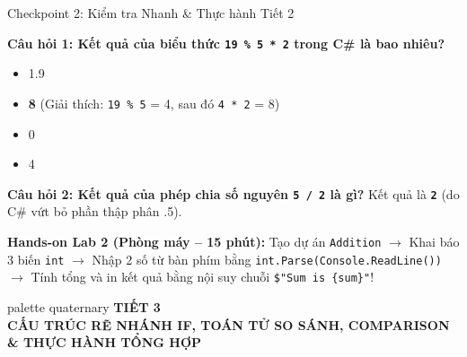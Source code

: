 \documentclass[aspectratio=169, 10pt]{beamer}
\begin{document}
\begin{frame}{Checkpoint 2: Kiểm tra Nhanh \& Thực hành Tiết 2}
  \begin{block}{\textbf{Câu hỏi 1: Kết quả của biểu thức \texttt{19 \% 5 * 2} trong C\# là bao nhiêu?}}
    \begin{itemize}
      \item[A.] 1.9
      \item[B.] \textbf{8} (Giải thích: \texttt{19 \% 5} = 4, sau đó \texttt{4 * 2} = 8)
      \item[C.] 0
      \item[D.] 4
    \end{itemize}
  \end{block}

  \begin{block}{\textbf{Câu hỏi 2: Kết quả của phép chia số nguyên \texttt{5 / 2} là gì?}}
    Kết quả là \textbf{\texttt{2}} (do C\# vứt bỏ phần thập phân .5).
  \end{block}

  \begin{exampleblock}{\textbf{Hands-on Lab 2 (Phòng máy -- 15 phút):}}
    Tạo dự án \texttt{Addition} $\to$ Khai báo 3 biến \texttt{int} $\to$ Nhập 2 số từ bàn phím bằng \texttt{int.Parse(Console.ReadLine())} $\to$ Tính tổng và in kết quả bằng nội suy chuỗi \texttt{\$"Sum is \{sum\}"}!
  \end{exampleblock}
\end{frame}

\begin{frame}[plain]
  \vfill
  \centering
  \begin{beamercolorbox}[sep=8pt,center,shadow=true,rounded=true]{palette quaternary}
    {\Huge \textbf{TIẾT 3}}\\[2mm]
    {\Large \textbf{CẤU TRÚC RẼ NHÁNH IF, TOÁN TỬ SO SÁNH, COMPARISON \& THỰC HÀNH TỔNG HỢP}}
  \end{beamercolorbox}
  \vfill
\end{frame}
\end{document}
